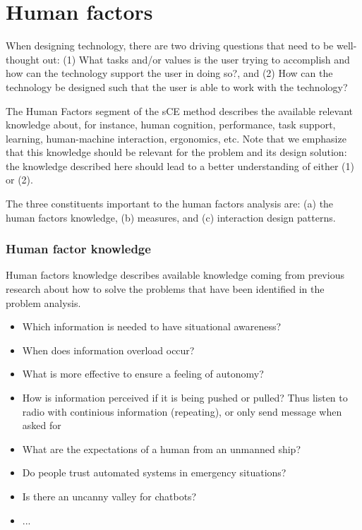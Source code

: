 \section{Human factors}
When designing technology, there are two driving questions that need to be well-thought out: (1) What tasks and/or values is the user trying to accomplish and how can the technology support the user in doing so?, and (2) How can the technology be designed such that the user is able to work with the technology?

The Human Factors segment of the sCE method describes the available relevant knowledge about, for instance, human cognition, performance, task support, learning, human-machine interaction, ergonomics, etc. Note that we emphasize that this knowledge should be relevant for the problem and its design solution: the knowledge described here should lead to a better understanding of either (1) or (2).

The three constituents important to the human factors analysis are: (a) the human factors knowledge, (b) measures, and (c) interaction design patterns.

\subsubsection{Human factor knowledge}
Human factors knowledge describes available knowledge coming from previous research about how to solve the problems that have been identified in the problem analysis. 
\begin{itemize}
	\item Which information is needed to have situational awareness? \cite{HFW2002} \cite{Breda1999} \cite{Prison2013} \cite{Hodgetts2015} \cite{Porathe2014}
	\item When does information overload occur? \cite{Arimura2001} \cite{Neerincx2008} \cite{Schutter2016} \cite{Porathe2014}
	\item What is more effective to ensure a feeling of autonomy? \cite{Feys2016}
	\item How is information perceived if it is being pushed or pulled? Thus listen to radio with continious information (repeating), or only send message when asked for
	\item What are the expectations of a human from an unmanned ship?
	\item Do people trust automated systems in emergency situations? \cite{Neerincx2008} \cite{Walliser2011}
	\item Is there an uncanny valley for chatbots?
	\item ...
\end{itemize}

